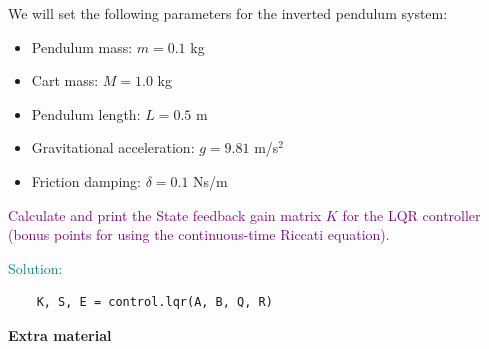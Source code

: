 \documentclass[a4 paper]{article}
\begin{document}
We will set the following parameters for the inverted pendulum system:
\begin{itemize}
    \item Pendulum mass: \( m = 0.1 \) kg
    \item Cart mass: \( M = 1.0 \) kg
    \item Pendulum length: \( L = 0.5 \) m
    \item Gravitational acceleration: \( g = 9.81 \) m/s\(^2\)
    \item Friction damping: \( \delta = 0.1 \) Ns/m
\end{itemize}

\textcolor{purple}{
     Calculate and print the State feedback gain matrix \( K \) for the LQR controller (bonus points for using the continuous-time Riccati equation).
}

\medbreak

\textcolor{teal}{
    Solution:
}

\begin{verbatim}
    K, S, E = control.lqr(A, B, Q, R)
\end{verbatim}

\bigbreak



    


\bigbreak
\bigbreak
\bigbreak
\bigbreak
\bigbreak
















\newpage
\textbf{\huge{Extra material}}
\end{document}

